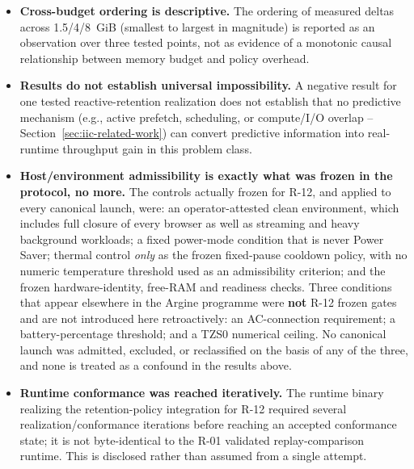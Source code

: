 \begin{itemize}
   hypothesis, never as a finding.
 \item \textbf{Cross-budget ordering is descriptive.} The ordering of
   measured deltas across 1.5/4/8~GiB (smallest to largest in magnitude) is
   reported as an observation over three tested points, not as evidence of
   a monotonic causal relationship between memory budget and policy
   overhead.
 \item \textbf{Results do not establish universal impossibility.} A negative
   result for one tested reactive-retention realization does not establish
   that no predictive mechanism (e.g., active prefetch, scheduling, or
   compute/I/O overlap -- Section~\ref{sec:iic-related-work}) can convert
   predictive information into real-runtime throughput gain in this problem
   class.
 \item \textbf{Host/environment admissibility is exactly what was frozen in
    the protocol, no more.} The controls actually frozen for R-12, and
    applied to every canonical launch, were: an operator-attested clean
    environment, which includes full closure of every browser as well as
    streaming and heavy background workloads; a fixed power-mode condition
    that is never Power Saver; thermal control \emph{only} as the frozen
    fixed-pause cooldown policy, with no numeric temperature threshold used
    as an admissibility criterion; and the frozen hardware-identity, free-RAM
    and readiness checks. Three conditions that appear elsewhere in the
    Argine programme were \textbf{not} R-12 frozen gates and are not
    introduced here retroactively: an AC-connection requirement; a
    battery-percentage threshold; and a TZS0 numerical ceiling. No canonical
    launch was admitted, excluded, or reclassified on the basis of any of
    the three, and none is treated as a confound in the results above.
 \item \textbf{Runtime conformance was reached iteratively.} The runtime
   binary realizing the retention-policy integration for R-12 required
   several realization/conformance iterations before reaching an accepted
   conformance state; it is not byte-identical to the R-01 validated
   replay-comparison runtime. This is disclosed rather than assumed from a
   single attempt.
\end{itemize}
